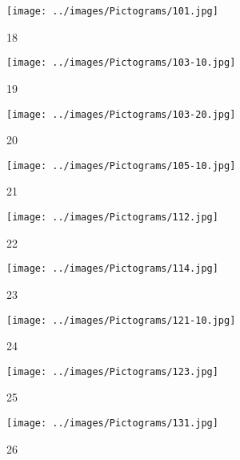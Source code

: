 \begin{figure}[H]
\hspace{3em}%
\begin{subfigure}[b]{0.1\textwidth}
	\centering
	\texttt{[image: ../images/Pictograms/101.jpg]}
	\caption{18}
\end{subfigure}
\hspace{3em}%
\begin{subfigure}[b]{0.1\textwidth}
\centering
\texttt{[image: ../images/Pictograms/103-10.jpg]}
\caption{19}
\end{subfigure}
\hspace{3em}%
\begin{subfigure}[b]{0.1\textwidth}
  \centering
  \texttt{[image: ../images/Pictograms/103-20.jpg]}
  \caption{20}
\end{subfigure}
\hspace{3em}%
\begin{subfigure}[b]{0.1\textwidth}
  \centering
  \texttt{[image: ../images/Pictograms/105-10.jpg]}
  \caption{21}
\end{subfigure}
\hspace{3em}%
\begin{subfigure}[b]{0.1\textwidth}
  \centering
  \texttt{[image: ../images/Pictograms/112.jpg]}
  \caption{22}
\end{subfigure}
\hspace{3em}%
\begin{subfigure}[b]{0.1\textwidth}
\centering
\texttt{[image: ../images/Pictograms/114.jpg]}
\caption{23}
\end{subfigure}
\hspace{3em}%
\begin{subfigure}[b]{0.1\textwidth}
  \centering
  \texttt{[image: ../images/Pictograms/121-10.jpg]}
  \caption{24}
\end{subfigure}
\hspace{3em}%
\begin{subfigure}[b]{0.1\textwidth}
  \centering
  \texttt{[image: ../images/Pictograms/123.jpg]}
  \caption{25}
\end{subfigure}
\hspace{3em}%
\begin{subfigure}[b]{0.1\textwidth}
  \centering
  \texttt{[image: ../images/Pictograms/131.jpg]}
  \caption{26}
\end{subfigure}
\hspace{3em}%
\begin{subfigure}[b]{0.1\textwidth}

\end{subfigure}
\end{figure}
